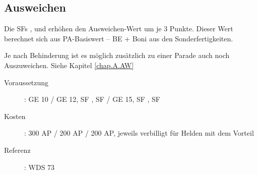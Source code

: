 \subsection{Ausweichen}
\label{sf.ausweichen}
Die SFs ,  und  erhöhen den Ausweichen-Wert um je 3 Punkte.
Dieser Wert berechnet sich aus PA-Basiswert – BE + Boni aus den Sonderfertigkeiten.

Je nach Behinderung ist es möglich zusätzlich zu einer Parade auch noch Auszuweichen.
Siehe Kapitel \ref{chap.A.AW}

\begin{description}
    \item[Voraussetzung]:
        GE 10 / GE 12, SF , SF  / GE 15, SF , SF 
    \item [Kosten]:
        300 AP / 200 AP / 200 AP, jeweils verbilligt für Helden mit dem Vorteil 
    \item [Referenz]:
        WDS 73
\end{description}
